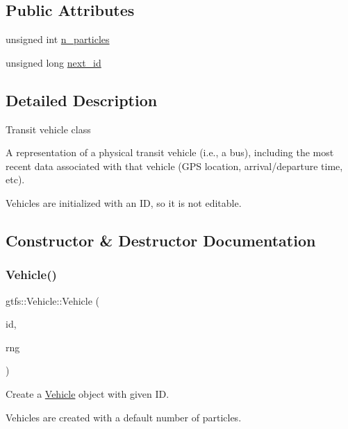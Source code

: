 \subsection*{Public Attributes}
\begin{DoxyCompactItemize}
\item 
unsigned int \hyperlink{classgtfs_1_1Vehicle_aa21babc8423abf92bbdf5e0748444f44}{n\+\_\+particles}
\item 
unsigned long \hyperlink{classgtfs_1_1Vehicle_aab535dd9953f9650e2adc351965779b1}{next\+\_\+id}
\end{DoxyCompactItemize}


\subsection{Detailed Description}
Transit vehicle class

A representation of a physical transit vehicle (i.\+e., a bus), including the most recent data associated with that vehicle (G\+PS location, arrival/departure time, etc).

Vehicles are initialized with an ID, so it is not editable. 

\subsection{Constructor \& Destructor Documentation}
\mbox{\label{classgtfs_1_1Vehicle_a8838934149e47eeb7160f1755012dcd4}} 
\subsubsection{\texorpdfstring{Vehicle()}{Vehicle()}\hspace{0.1cm}{\footnotesize\ttfamily [1/2]}}
{\footnotesize\ttfamily gtfs\+::\+Vehicle\+::\+Vehicle (\begin{DoxyParamCaption}\item[{std\+::string}]{id,  }\item[{\hyperlink{classsampling_1_1RNG}{sampling\+::\+R\+NG} \&}]{rng }\end{DoxyParamCaption})}

Create a \hyperlink{classgtfs_1_1Vehicle}{Vehicle} object with given ID.

Vehicles are created with a default number of particles.


